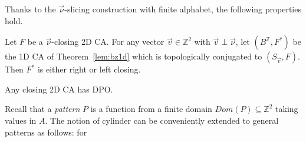 \documentclass{llncs}
\newcommand{\z}{\ensuremath{\mathbb{Z}}\xspace}
\newcommand{\sv}{S_{\vec v}}
\newcommand{\zdu}{\ensuremath{\mathbb{Z}^2}\xspace}
\newcommand{\set}[1]{\left\{#1\right\}}
\newcommand{\sh}[1]{\mathbf{[}#1\mathbf{]}} \newcommand{\zu}{\set{0,1}}
\newcommand{\para}[1]{(#1)}
\newcommand{\nn}{\vec\nu}
\newcommand{\mm}{\vec \mu}
\newcommand{\xx}{\vec x}
\newcommand{\vv}{\vec v}
\begin{document}
Thanks to the $\nn$-slicing construction with finite alphabet, the
following properties hold.
\begin{proposition}\label{lem:closing1d}
Let $F$ be a $\nn$-closing 2D CA. For any vector $\vv\in\zdu$ with
$\vv\perp\nn$, let $\para{B^{\z}, F^*}$ be the 1D CA of
Theorem~\ref{lem:bz1d} which is topologically conjugated to
$\para{\sv, F}$.
Then $F^*$ is either right or left closing.
\end{proposition}
\begin{theorem}\label{th:closingDPO}
  Any closing 2D CA has DPO.
\end{theorem}
\begin{comment}
We now deal with the relation between openness and closingness.
Recall that in 1D case, a CA is open if and only if it is both
left and right closing. In 2D settings, a weaker result holds,
namely that 4-closing 2D CA are open. We conjecture that also the
opposite relation is true.
\smallskip\\
Let $\lambda$ and $\mm$ be two integer vectors. We give notions
and results assuming that $\lambda\cdot {\vec e_2}>0$ and
$\mm\cdot {\vec e_2}>0$. Analogous results are obtained for the
other cases. For $t,m\geq 1$, $q,q'\in\z$, we say that a pattern
$u$ has a $(\lambda,\mm)$-\emph{shape} $\sh{m,t,q,q'}$ if
$dom(u)=\set{\xx\in\zdu\;|\;q\leq \lambda\xx\leq q+m-1
\;\text{and}\; q'\leq \mm\xx\leq q'+t-1}$.
\begin{proposition}[\cite{dennunzio08,dennunzio09ja}]\label{prop:NEclosCasino}
   Consider a $\nn$-closing 2D CA $F$. Then, for all sufficiently
   large $m>0$, any $\mm\in\zdu$, and $t\geq1, q,q'\in\z$, if  $u$ and $v$ are
   patterns of $(\nn,\mm)$-shape $\sh{m,t,q,q'}$
   and $[2m,t,q,q']$, resp.,
   and $F([u])\cap [v]\ne\emptyset$, then
   for each pattern $b$ of $(\nn,\mm)$-shape $\sh{1,t,q+2m,q'}$ there exists a
   pattern $a$ of $(\nn,\mm)$-shape $\sh{1,t,q+m,q'}$
   such that
   \begin{equation}\label{eq:propvthesis}
    F([u\oplus a])\cap[v\oplus b]
   \ne\emptyset\enspace .
   \end{equation}
\end{proposition}
Proposition~\ref{prop:NEclosCasino} is useful to prove the
following result.
\end{comment}
Recall that a \emph{pattern} $P$ is a function from a finite domain
$Dom(P)\subseteq\zdu$ taking values in $A$. The notion of cylinder
can be conveniently extended to general patterns as follows: for
\end{document}
